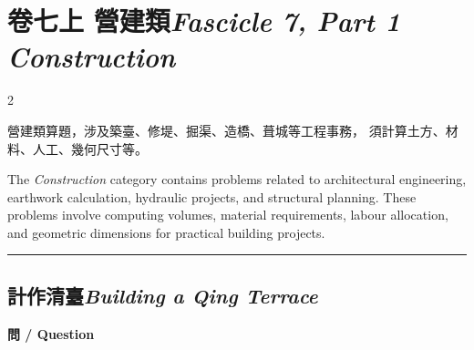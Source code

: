 \documentclass[11pt,a4paper]{article}
\newcommand{\bilingualsection}[2]{\section{#1\hfill\textit{\small #2}}}
\newcommand{\bilingualsubsection}[2]{\subsection{#1\quad\textit{#2}}}
\newcommand{\longline}{\noindent\rule{\textwidth}{0.4pt}}
\begin{document}
\newpage

\bilingualsection{卷七上 \quad 營建類}{Fascicle 7, Part 1 \quad Construction}
\label{sec:fasc7a}

\begin{center}
\end{center}

\medskip

\begin{paracol}{2}

\textcolor{chinesecolor}{%
營建類算題，涉及築臺、修堤、掘渠、造橋、葺城等工程事務，
須計算土方、材料、人工、幾何尺寸等。
}

\switchcolumn

\textcolor{englishcolor}{%
The \textit{Construction} category contains problems related to architectural engineering,
earthwork calculation, hydraulic projects, and structural planning.
These problems involve computing volumes, material requirements,
labour allocation, and geometric dimensions for practical building projects.
}

\end{paracol}

\vspace{0.8em}
\longline

\bilingualsubsection{計作清臺}{Building a Qing Terrace}

\vspace{0.4em}

\noindent\textbf{\textcolor{chinesecolor}{問} / \textcolor{englishcolor}{Question}}

\vspace{0.3em}
\end{document}
